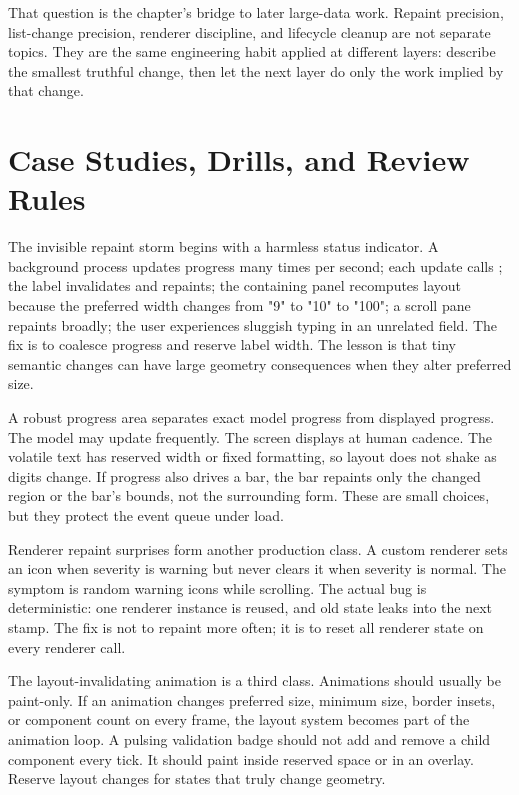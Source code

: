 That question is the chapter's bridge to later large-data work. Repaint precision, list-change precision, renderer discipline, and lifecycle cleanup are not separate topics. They are the same engineering habit applied at different layers: describe the smallest truthful change, then let the next layer do only the work implied by that change.

\section{Case Studies, Drills, and Review Rules}

The invisible repaint storm begins with a harmless status indicator. A background process updates progress many times per second; each update calls ; the label invalidates and repaints; the containing panel recomputes layout because the preferred width changes from "9" to "10" to "100"; a scroll pane repaints broadly; the user experiences sluggish typing in an unrelated field. The fix is to coalesce progress and reserve label width. The lesson is that tiny semantic changes can have large geometry consequences when they alter preferred size.

A robust progress area separates exact model progress from displayed progress. The model may update frequently. The screen displays at human cadence. The volatile text has reserved width or fixed formatting, so layout does not shake as digits change. If progress also drives a bar, the bar repaints only the changed region or the bar's bounds, not the surrounding form. These are small choices, but they protect the event queue under load.

Renderer repaint surprises form another production class. A custom renderer sets an icon when severity is warning but never clears it when severity is normal. The symptom is random warning icons while scrolling. The actual bug is deterministic: one renderer instance is reused, and old state leaks into the next stamp. The fix is not to repaint more often; it is to reset all renderer state on every renderer call.

The layout-invalidating animation is a third class. Animations should usually be paint-only. If an animation changes preferred size, minimum size, border insets, or component count on every frame, the layout system becomes part of the animation loop. A pulsing validation badge should not add and remove a child component every tick. It should paint inside reserved space or in an overlay. Reserve layout changes for states that truly change geometry.

